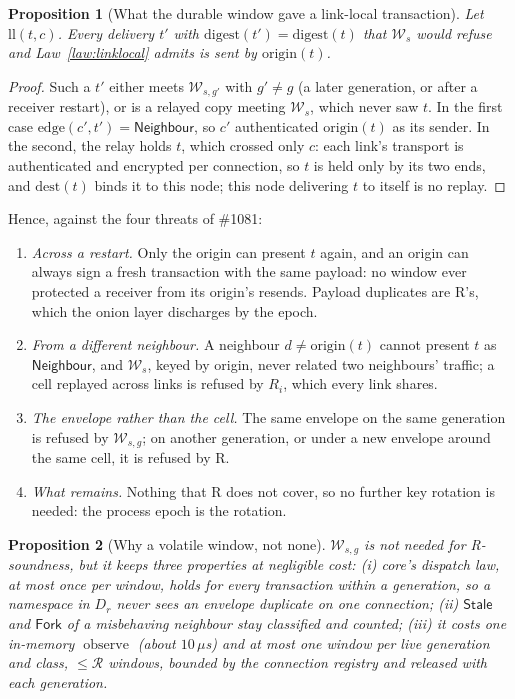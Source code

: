 \documentclass[journal]{IEEEtran}
\newtheorem{proposition}{Proposition}
\newcommand{\obs}{\operatorname{observe}}
\newcommand{\W}{\mathcal{W}}
\newcommand{\issue}[1]{\#{#1}}
\begin{document}
\begin{proposition}[What the durable window gave a link-local transaction]
\label{prop:llloss}
Let $\mathrm{ll}(t,c)$.  Every delivery $t'$ with $\mathrm{digest}(t')=\mathrm{digest}(t)$
that $\W_s$ would refuse and Law~\ref{law:linklocal} admits is sent by $\mathrm{origin}(t)$.
\end{proposition}
\begin{proof}
Such a $t'$ either meets $\W_{s,g'}$ with $g'\ne g$ (a later generation, or after a receiver
restart), or is a relayed copy meeting $\W_s$, which never saw $t$.  In the first case
$\mathrm{edge}(c',t')=\mathsf{Neighbour}$, so $c'$ authenticated $\mathrm{origin}(t)$ as its
sender.  In the second, the relay holds $t$, which crossed only $c$: each link's transport is
authenticated and encrypted per connection, so $t$ is held only by its two ends, and
$\mathrm{dest}(t)$ binds it to this node; this node delivering $t$ to itself is no replay.
\end{proof}

Hence, against the four threats of \issue{1081}:
\begin{enumerate}[leftmargin=1.5em]
\item \emph{Across a restart.} Only the origin can present $t$ again, and an origin can always
sign a fresh transaction with the same payload: no window ever protected a receiver from its
origin's resends.  Payload duplicates are R's, which the onion layer discharges by the
epoch.
\item \emph{From a different neighbour.} A neighbour $d\neq\mathrm{origin}(t)$ cannot present
$t$ as $\mathsf{Neighbour}$, and $\W_s$, keyed by origin, never related two neighbours'
traffic; a cell replayed across links is refused by $R_i$, which every link shares.
\item \emph{The envelope rather than the cell.} The same envelope on the same generation is
refused by $\W_{s,g}$; on another generation, or under a new envelope around the same cell,
it is refused by R.
\item \emph{What remains.} Nothing that R does not cover, so no further key rotation is
needed: the process epoch is the rotation.
\end{enumerate}

\begin{proposition}[Why a volatile window, not none]\label{prop:llvolatile}
$\W_{s,g}$ is not needed for R-soundness, but it keeps three properties at negligible cost:
(i) core's dispatch law, at most once per window, holds for every transaction within a
generation, so a namespace in $D_r$ never sees an envelope duplicate on one connection;
(ii) $\mathsf{Stale}$ and $\mathsf{Fork}$ of a misbehaving neighbour stay classified and
counted; (iii) it costs one in-memory $\obs$ (about $10\,\mu$s) and at most one window per
live generation and class, $\le\mathcal R$ windows, bounded by the connection registry and
released with each generation.
\end{proposition}
\end{document}
